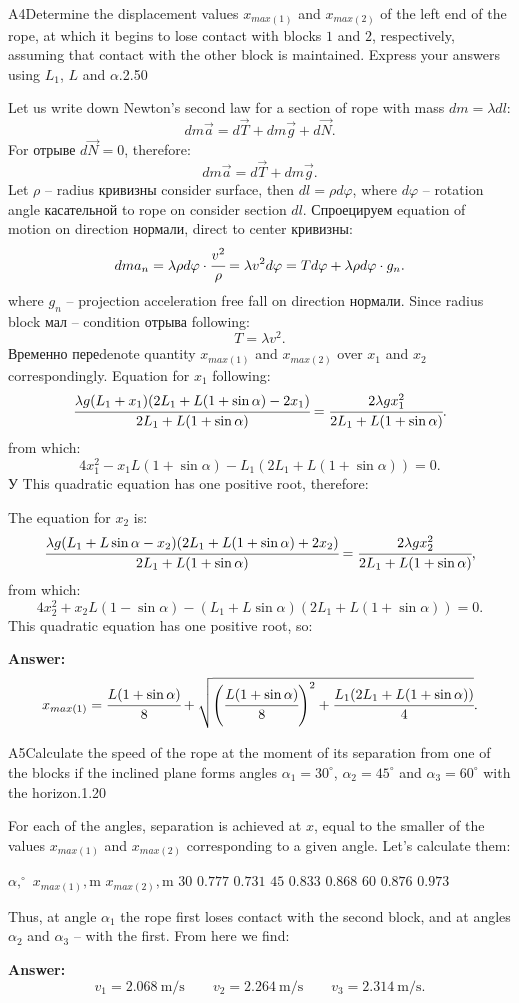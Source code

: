 \documentclass[11pt,a4paper]{article}
\begin{document}
\begin{solcard}{A4}{Determine the displacement values $x_{{max}(1)}$ and $x_{{max}(2)}$ of the left end of the rope, at which it begins to lose contact with blocks $1$ and $2$, respectively, assuming that contact with the other block is maintained. Express your answers using $L_1$, $L$ and $\alpha$.}{2.50}

Let us write down Newton’s second law for a section of rope with mass $dm=\lambda dl$: $$dm\vec{a}=d\vec{T}+dm\vec{g}+d\vec{N}{.} $$For отрыве $d\vec{N}=0$, therefore: $$dm\vec{a}=d\vec{T}+dm\vec{g}{.} $$Let $\rho$ – radius кривизны consider surface, then $dl=\rho d\varphi$, where $d\varphi$ – rotation angle касательной to rope on consider section $dl$. Спроецируем equation of motion on direction нормали, direct to center кривизны: $$dma_n=\lambda\rho d\varphi\cdot\cfrac{v^2}{\rho}=\lambda v^2d\varphi=Td\varphi+\lambda\rho d\varphi\cdot g_n{.} $$where $g_n$ – projection acceleration free fall on direction нормали. Since radius block мал – condition отрыва following: $$T=\lambda v^2{.} $$Временно переdenote quantity $x_{max (1)}$ and $x_{max(2)}$  over $x_1$ and $x_2$ correspondingly. Equation for $x_1$ following: $$\cfrac{\lambda g(L_1+x_1)(2L_1+L(1+\sin\alpha)-2x_1)}{2L_1+L(1+\sin\alpha)}=\cfrac{2\lambda gx^2_1}{2L_1+L(1+\sin\alpha)}{.} $$from which: $$4x^2_1-x_1L(1+\sin\alpha)-L_1(2L_1+L(1+\sin\alpha))=0{.} $$У This quadratic equation has one positive root, therefore:


The equation for $x_2$ is: $$\cfrac{\lambda g(L_1+L\sin\alpha-x_2)(2L_1+L(1+\sin\alpha)+2x_2)}{2L_1+L(1+\sin\alpha)}=\cfrac{2\lambda gx^2_2}{2L_1+L(1+\sin\alpha)}{,} $$from which: $$4x^2_2+x_2L(1-\sin\alpha)-(L_1+L\sin\alpha)(2L_1+L(1+\sin\alpha))=0{.} $$This quadratic equation has one positive root, so:

\par\smallskip\noindent\textbf{Answer:} $$x_{max(1)}=\cfrac{L(1+\sin\alpha)}{8}+\sqrt{\left(\cfrac{L(1+\sin\alpha)}{8}\right)^2+\cfrac{L_1(2L_1+L(1+\sin\alpha))}{4}}{.} $$
\end{solcard}

\begin{solcard}{A5}{Calculate the speed of the rope at the moment of its separation from one of the blocks if the inclined plane forms angles $\alpha_1=30^{\circ}$, $\alpha_2=45^{\circ}$ and $\alpha_3=60^{\circ}$ with the horizon.}{1.20}

For each of the angles, separation is achieved at $x$, equal to the smaller of the values $x_{max(1)}$ and $x_{max(2)}$ corresponding to a given angle. Let's calculate them:


$\alpha,^{\circ}$ $x_{max(1)},\text{m}$ $x_{max(2)},\text{m}$ $30$ $0{.}777$ $0{.}731$ $45$ $0{.}833$ $0{.}868$ $60$ $0{.}876$ $0{.}973$


Thus, at angle $\alpha_1$ the rope first loses contact with the second block, and at angles $\alpha_2$ and $\alpha_3$ – with the first. From here we find:

\par\smallskip\noindent\textbf{Answer:} $$v_1=2{.}068~\text{m}/\text{s}\qquad v_2=2{.}264~\text{m}/\text{s}\qquad v_3=2{.}314~\text{m}/\text{s}{.} $$
\end{solcard}
\end{document}
